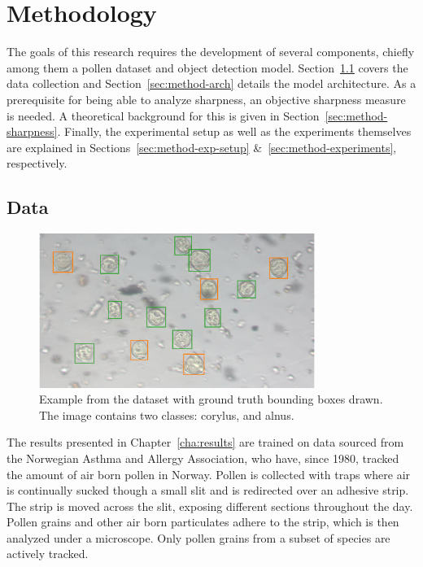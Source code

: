 \chapter{Methodology}\label{cha:method}

The goals of this research requires the development of several components, chiefly among them a pollen dataset and object detection model.
Section~\ref{sec:method-dataset} covers the data collection and Section~\ref{sec:method-arch} details the model architecture.
As a prerequisite for being able to analyze sharpness, an objective sharpness measure is needed.
A theoretical background for this is given in Section~\ref{sec:method-sharpness}.
Finally, the experimental setup as well as the experiments themselves are explained in Sections~\ref{sec:method-exp-setup} \&~\ref{sec:method-experiments}, respectively.

\section{Data}\label{sec:method-dataset}

\begin{figure}[htbp]
  \centering
  \includegraphics[width=0.8\textwidth]{figs/method/Snap-057.png}
  \caption[Dataset example]{Example from the dataset with ground truth bounding boxes drawn.
The image contains two classes: \textcolor{corylus}{corylus}, and \textcolor{alnus}{alnus}.}\label{fig:dataset-sample}
\end{figure}

The results presented in Chapter~\ref{cha:results} are trained on data sourced from the Norwegian Asthma and Allergy Association, who have, since 1980, tracked the amount of air born pollen in Norway.
Pollen is collected with traps where air is continually sucked though a small slit and is redirected over an adhesive strip.
The strip is moved across the slit, exposing different sections throughout the day.
Pollen grains and other air born particulates adhere to the strip, which is then analyzed under a microscope.
Only pollen grains from a subset of species are actively tracked.

